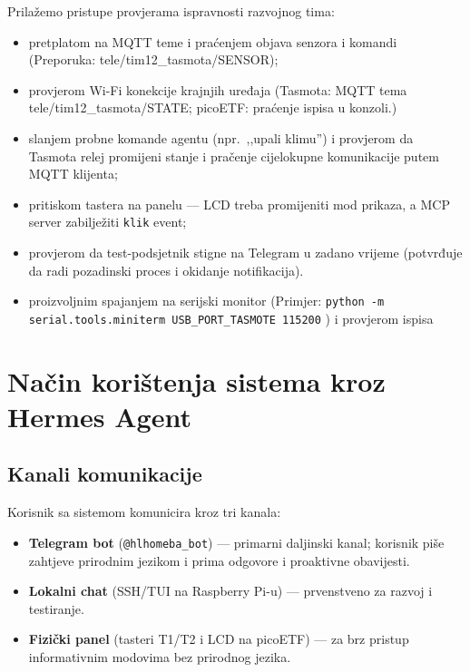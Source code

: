 \documentclass[11pt,a4paper]{article}
\begin{document}
Prilažemo pristupe provjerama ispravnosti razvojnog tima:
\begin{itemize}[nosep]
      \item pretplatom na MQTT teme i praćenjem objava senzora i komandi (Preporuka: tele/tim12\_tasmota/SENSOR);
      \item provjerom Wi-Fi konekcije krajnjih uređaja (Tasmota: MQTT tema tele/tim12\_tasmota/STATE; picoETF: praćenje ispisa u konzoli.)
      \item slanjem probne komande agentu (npr.\ ,,upali klimu'') i provjerom da Tasmota
            relej promijeni stanje i pračenje cijelokupne komunikacije putem MQTT klijenta;
      \item pritiskom tastera na panelu --- LCD treba promijeniti mod prikaza, a MCP server
            zabilježiti \texttt{klik} event;
      \item provjerom da test-podsjetnik stigne na Telegram u zadano vrijeme (potvrđuje da
            radi pozadinski proces i okidanje notifikacija).
      \item proizvoljnim spajanjem na serijski monitor (Primjer: \texttt{python -m serial.tools.miniterm USB\_PORT\_TASMOTE 115200} ) i provjerom ispisa

\end{itemize}

\section{Način korištenja sistema kroz Hermes Agent}

\subsection{Kanali komunikacije}

Korisnik sa sistemom komunicira kroz tri kanala:
\begin{itemize}[nosep]
      \item \textbf{Telegram bot} (\texttt{@hlhomeba\_bot}) --- primarni daljinski kanal;
            korisnik piše zahtjeve prirodnim jezikom i prima odgovore i proaktivne obavijesti.
      \item \textbf{Lokalni chat} (SSH/TUI na Raspberry Pi-u) --- prvenstveno za razvoj i
            testiranje.
      \item \textbf{Fizički panel} (tasteri T1/T2 i LCD na picoETF) --- za brz pristup
            informativnim modovima bez prirodnog jezika.
\end{itemize}
\end{document}
